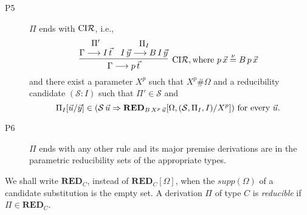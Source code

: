 \documentclass[preprint]{elsarticle}
\def\Sscr{{\mathcal S}}
\newcommand{\Seq}[2]{#1\longrightarrow #2}
\newcommand{\defnu}{\stackrel{\nu}{=}}
\newcommand{\coindR}{{\rm CI}{\cal R}}
\def\RED{{\mathbf{RED}}}
\begin{document}
\begin{definition}
\begin{description}
\item[P5] $\Pi$ ends with $\coindR$, i.e.,
  $$
  \infer[\coindR, \hbox{where $p\,\vec x \defnu B\,p\,\vec x$ }]
  {\Seq \Gamma {p\,\vec t} }
  {
    \deduce{\Seq \Gamma {I\,\vec t}}{\Pi'}
    &
    \deduce{\Seq {I\,\vec y}{B\,I\,\vec y}}{\Pi_I}
  }
  $$
  and there exist a parameter $X^p$ such that $X^p \# \Omega$ and a
  reducibility candidate $(\Sscr : I)$ such that $\Pi' \in \Sscr$ and
  $$
  \Pi_I[\vec u/ \vec y] \in (\Sscr\,\vec u \Rightarrow
  \RED_{B\,X^p\,\vec u}[\Omega, (\Sscr, \Pi_I, I)/X^p]) \ \hbox{for every
    $\vec u$.  }
  $$

\item[P6] $\Pi$ ends with any other rule and its major premise derivations 
  are in the parametric reducibility sets of the appropriate types.
\end{description}
We shall write $\RED_C$, instead of $\RED_C[\Omega]$, when the
$supp(\Omega)$ of a candidate substitution is the empty set.  A
derivation $\Pi$ of type $C$ is \emph{reducible} if $\Pi \in \RED_C$.
\end{definition}
\end{document}
